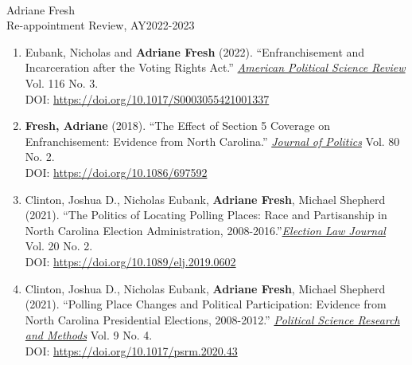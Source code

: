 \documentclass[11pt]{article}
\begin{document}
\singlespacing
\setlength{\parindent}{0in}
\setlength{\parskip}{0in}







\noindent \large{\textbf{}} \\ \normalsize
\noindent Adriane Fresh \\
\noindent Re-appointment Review, AY2022-2023  \\

\vspace*{.2in}

\begin{enumerate}
    \item Eubank, Nicholas and \textbf{Adriane Fresh} (2022). ``Enfranchisement and Incarceration after the Voting Rights Act.'' \underline{\emph{American Political Science Review}} Vol. 116 No. 3. \\ DOI: \url{https://doi.org/10.1017/S0003055421001337} \\

    \item \textbf{Fresh, Adriane} (2018). ``The Effect of Section 5 Coverage on Enfranchisement: Evidence from North Carolina.'' \underline{\emph{Journal of Politics}} Vol. 80 No. 2.\\ DOI: \url{https://doi.org/10.1086/697592} \\


    \item Clinton, Joshua D., Nicholas Eubank, \textbf{Adriane Fresh}, Michael Shepherd (2021). ``The Politics of Locating Polling Places:  Race and Partisanship in North Carolina Election Administration, 2008-2016.''\underline{\emph{Election Law Journal}}  Vol. 20 No. 2. \\ DOI: \url{https://doi.org/10.1089/elj.2019.0602} \\

    \item Clinton, Joshua D., Nicholas Eubank, \textbf{Adriane Fresh}, Michael Shepherd (2021). ``Polling Place Changes and Political Participation: Evidence from North Carolina Presidential Elections, 2008-2012.'' \underline{\emph{Political Science Research and Methods}} Vol. 9 No. 4. \\ DOI: \url{https://doi.org/10.1017/psrm.2020.43}
\end{enumerate}
\end{document}
